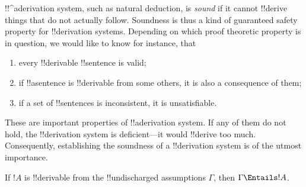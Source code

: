 \documentclass[../../../include/open-logic-section]{subfiles}
\begin{document}

\begin{explain}
!!^a{derivation} system, such as natural deduction, is \emph{sound}
if it cannot !!{derive} things that do not actually follow.  Soundness is
thus a kind of guaranteed safety property for !!{derivation} systems.
Depending on which proof theoretic property is in question, we would
like to know for instance, that
\begin{enumerate}
\item every !!{derivable} !!{sentence} is valid;
\item if !!a{sentence} is !!{derivable} from some others, it is also a
  consequence of them;
\item if a set of !!{sentence}s is inconsistent, it is unsatisfiable.
\end{enumerate}
These are important properties of !!a{derivation} system. If any of
them do not hold, the !!{derivation} system is deficient---it would
!!{derive} too much.  Consequently, establishing the soundness of a
!!{derivation} system is of the utmost importance.
\end{explain}

\begin{thm}[Soundness]
If $!A$ is !!{derivable} from the !!{undischarged} assumptions
$\Gamma$, then $\Gamma \Entails !A$.
\end{thm}
\end{document}
